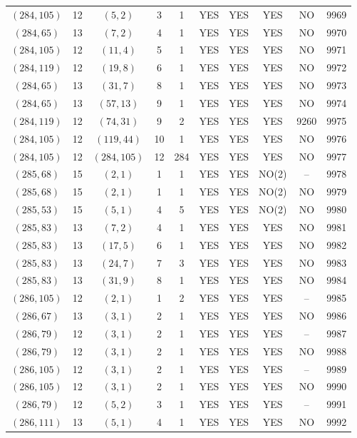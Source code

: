 \begin{longtable}{|c|c|c|c|c|c|c|c|c|c|}
$(284, 105)$ & 12 & $(5, 2)$ & 3 & 1 & YES & YES & YES & NO & 9969\\
$(284, 65)$ & 13 & $(7, 2)$ & 4 & 1 & YES & YES & YES & NO & 9970\\
$(284, 105)$ & 12 & $(11, 4)$ & 5 & 1 & YES & YES & YES & NO & 9971\\
$(284, 119)$ & 12 & $(19, 8)$ & 6 & 1 & YES & YES & YES & NO & 9972\\
$(284, 65)$ & 13 & $(31, 7)$ & 8 & 1 & YES & YES & YES & NO & 9973\\
$(284, 65)$ & 13 & $(57, 13)$ & 9 & 1 & YES & YES & YES & NO & 9974\\
$(284, 119)$ & 12 & $(74, 31)$ & 9 & 2 & YES & YES & YES & 9260 & 9975\\
$(284, 105)$ & 12 & $(119, 44)$ & 10 & 1 & YES & YES & YES & NO & 9976\\
$(284, 105)$ & 12 & $(284, 105)$ & 12 & 284 & YES & YES & YES & NO & 9977\\
$(285, 68)$ & 15 & $(2, 1)$ & 1 & 1 & YES & YES & NO(2) & -- & 9978\\
$(285, 68)$ & 15 & $(2, 1)$ & 1 & 1 & YES & YES & NO(2) & NO & 9979\\
$(285, 53)$ & 15 & $(5, 1)$ & 4 & 5 & YES & YES & NO(2) & NO & 9980\\
$(285, 83)$ & 13 & $(7, 2)$ & 4 & 1 & YES & YES & YES & NO & 9981\\
$(285, 83)$ & 13 & $(17, 5)$ & 6 & 1 & YES & YES & YES & NO & 9982\\
$(285, 83)$ & 13 & $(24, 7)$ & 7 & 3 & YES & YES & YES & NO & 9983\\
$(285, 83)$ & 13 & $(31, 9)$ & 8 & 1 & YES & YES & YES & NO & 9984\\
$(286, 105)$ & 12 & $(2, 1)$ & 1 & 2 & YES & YES & YES & -- & 9985\\
$(286, 67)$ & 13 & $(3, 1)$ & 2 & 1 & YES & YES & YES & NO & 9986\\
$(286, 79)$ & 12 & $(3, 1)$ & 2 & 1 & YES & YES & YES & -- & 9987\\
$(286, 79)$ & 12 & $(3, 1)$ & 2 & 1 & YES & YES & YES & NO & 9988\\
$(286, 105)$ & 12 & $(3, 1)$ & 2 & 1 & YES & YES & YES & -- & 9989\\
$(286, 105)$ & 12 & $(3, 1)$ & 2 & 1 & YES & YES & YES & NO & 9990\\
$(286, 79)$ & 12 & $(5, 2)$ & 3 & 1 & YES & YES & YES & -- & 9991\\
$(286, 111)$ & 13 & $(5, 1)$ & 4 & 1 & YES & YES & YES & NO & 9992\\

\end{longtable}
